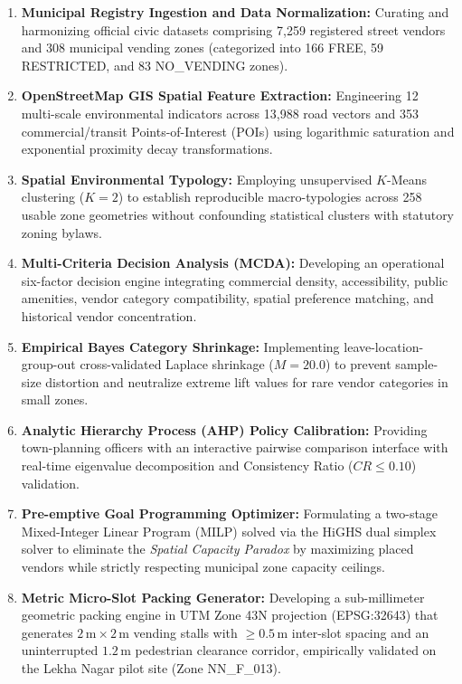 \begin{enumerate}
    \item \textbf{Municipal Registry Ingestion and Data Normalization:} Curating and harmonizing official civic datasets comprising 7,259 registered street vendors and 308 municipal vending zones (categorized into 166 FREE, 59 RESTRICTED, and 83 NO\_VENDING zones).
    \item \textbf{OpenStreetMap GIS Spatial Feature Extraction:} Engineering 12 multi-scale environmental indicators across 13,988 road vectors and 353 commercial/transit Points-of-Interest (POIs) using logarithmic saturation and exponential proximity decay transformations.
    \item \textbf{Spatial Environmental Typology:} Employing unsupervised $K$-Means clustering ($K=2$) to establish reproducible macro-typologies across 258 usable zone geometries without confounding statistical clusters with statutory zoning bylaws.
    \item \textbf{Multi-Criteria Decision Analysis (MCDA):} Developing an operational six-factor decision engine integrating commercial density, accessibility, public amenities, vendor category compatibility, spatial preference matching, and historical vendor concentration.
    \item \textbf{Empirical Bayes Category Shrinkage:} Implementing leave-location-group-out cross-validated Laplace shrinkage ($M=20.0$) to prevent sample-size distortion and neutralize extreme lift values for rare vendor categories in small zones.
    \item \textbf{Analytic Hierarchy Process (AHP) Policy Calibration:} Providing town-planning officers with an interactive pairwise comparison interface with real-time eigenvalue decomposition and Consistency Ratio ($CR \le 0.10$) validation.
    \item \textbf{Pre-emptive Goal Programming Optimizer:} Formulating a two-stage Mixed-Integer Linear Program (MILP) solved via the HiGHS dual simplex solver to eliminate the \textit{Spatial Capacity Paradox} by maximizing placed vendors while strictly respecting municipal zone capacity ceilings.
    \item \textbf{Metric Micro-Slot Packing Generator:} Developing a sub-millimeter geometric packing engine in UTM Zone 43N projection (EPSG:32643) that generates $2\,\text{m} \times 2\,\text{m}$ vending stalls with $\ge 0.5\,\text{m}$ inter-slot spacing and an uninterrupted $1.2\,\text{m}$ pedestrian clearance corridor, empirically validated on the Lekha Nagar pilot site (Zone NN\_F\_013).

\end{enumerate}
